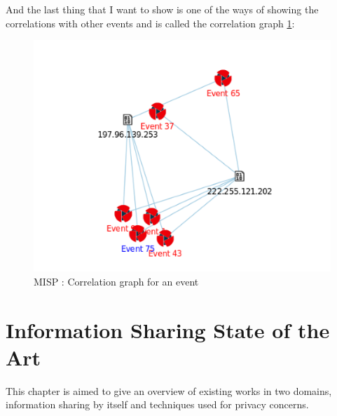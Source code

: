 \documentclass{eplmastersthesis}
\begin{document}
And the last thing that I want to show is one of the ways of showing the correlations with other events and is called the correlation graph \ref{webcorrelation}:
\begin{figure}[!h]
	\begin{center}
		\includegraphics[scale=0.35]{res/webCorrelationGraph}
		\caption{MISP : Correlation graph for an event}
		\label{webcorrelation}
	\end{center}
\end{figure}



\chapter{Information Sharing State of the Art}

This chapter is aimed to give an overview of existing works in two domains, information sharing by itself and techniques used for privacy concerns.\\
\end{document}
